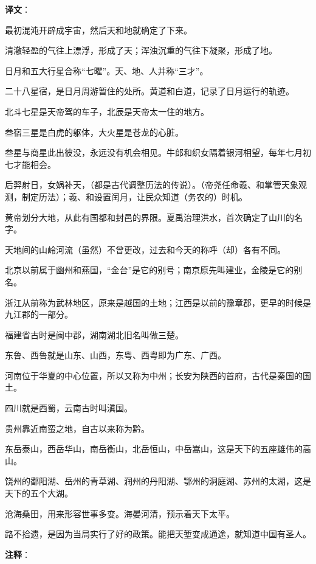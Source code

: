 \documentclass[12pt,UTF-8,openany]{ctexbook}
\begin{document}
\clearpage

\textbf{译文}：

最初混沌开辟成宇宙，然后天和地就确定了下来。

清澈轻盈的气往上漂浮，形成了天；浑浊沉重的气往下凝聚，形成了地。

日月和五大行星合称“七曜”。天、地、人并称“三才”。

二十八星宿，是日月周游暂住的处所。黄道和白道，记录了日月运行的轨迹。

北斗七星是天帝驾的车子，北辰是天帝太一住的地方。

叁宿三星是白虎的躯体，大火星是苍龙的心脏。

叁星与商星此出彼没，永远没有机会相见。牛郎和织女隔着银河相望，每年七月初七才能相会。

后羿射日，女娲补天，（都是古代调整历法的传说）。（帝尧任命羲、和掌管天象观测，制定历法）；羲、和设置闰月，让民众知道（务农的）时机。

黄帝划分大地，从此有国都和封邑的界限。夏禹治理洪水，首次确定了山川的名字。

天地间的山岭河流（虽然）不曾更改，过去和今天的称呼（却）各有不同。

北京以前属于幽州和燕国，“金台”是它的别号；南京原先叫建业，金陵是它的别名。

浙江从前称为武林地区，原来是越国的土地；江西是以前的豫章郡，更早的时候是九江郡的一部分。

福建省古时是闽中郡，湖南湖北旧名叫做三楚。

东鲁、西鲁就是山东、山西，东粤、西粤即为广东、广西。

河南位于华夏的中心位置，所以又称为中州；长安为陕西的首府，古代是秦国的国土。

四川就是西蜀，云南古时叫滇国。

贵州靠近南蛮之地，自古以来称为黔。

东岳泰山，西岳华山，南岳衡山，北岳恒山，中岳嵩山，这是天下的五座雄伟的高山。

饶州的鄱阳湖、岳州的青草湖、润州的丹阳湖、鄂州的洞庭湖、苏州的太湖，这是天下的五个大湖。

沧海桑田，用来形容世事多变。海晏河清，预示着天下太平。

路不拾遗，是因为当局实行了好的政策。能把天堑变成通途，就知道中国有圣人。

\begin{normalsize}
    
\end{normalsize}

\newpage

\textbf{注释}：
\end{document}
